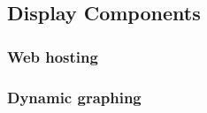 \documentclass[onecolumn, draftclsnofoot, 10pt, compsoc]{IEEEtran}
\begin{document}
\subsection{Display Components}

\subsubsection{Web hosting}

\subsubsection{Dynamic graphing}




\end{document}
